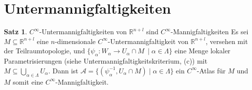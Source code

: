 \documentclass[a4paper,11pt,notitlepage]{report}
\theoremstyle{definition}
\newtheorem{theorem}{Satz}[chapter]
\newcommand{\R}{{\ensuremath{\mathbb{R}}}}
\begin{document}
\section{Untermannigfaltigkeiten}
\begin{theorem}{$C^\infty$-Untermannigfaltigkeiten von $\R^{n+l}$ sind $C^\infty$-Mannigfaltigkeiten}
	Es sei $M \subseteq \R^{n+l}$ eine $n$-dimensionale $C^\infty$-Untermannigfaltigkeit von $\R^{n+l}$, versehen mit der Teilraumtopologie, und $\{\psi_\alpha \colon W_\alpha \rightarrow U_\alpha \cap M\ \mid \alpha \in \Lambda\}$ eine Menge lokaler Parametrisierungen (siehe Untermannigfaltigkeitskriterium, (c)) mit $M \subseteq \bigcup\limits_{\alpha \in \Lambda}{U_\alpha}$.
	\newline
	Dann ist $\mathcal{A}=\{(\psi_\alpha^{-1}, U_\alpha \cap M) \mid \alpha \in \Lambda\}$ ein $C^\infty$-Atlas für $M$ und $M$ somit eine $C^\infty$-Mannigfaltigkeit.
\end{theorem}
\end{document}
